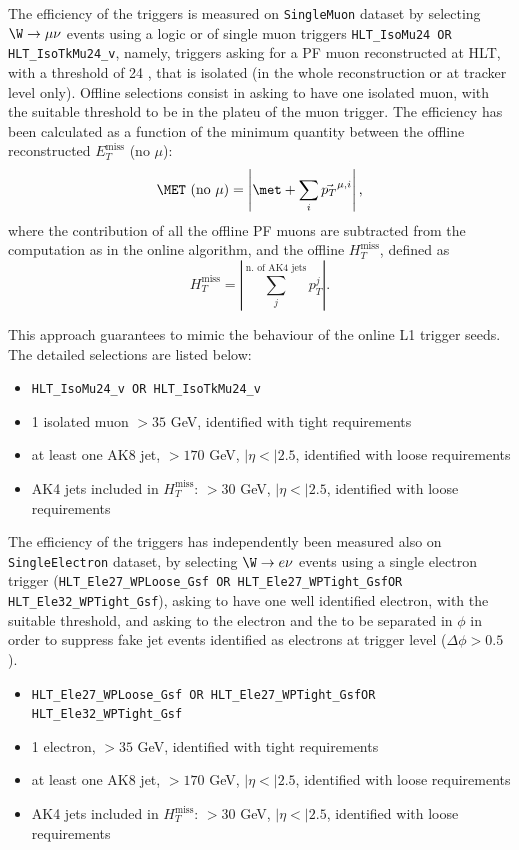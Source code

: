 \noindent The efficiency of the \met triggers is measured on {\tt SingleMuon} dataset by selecting $\W \to \mu \nu$ events using a logic or of single muon triggers {\tt HLT\_IsoMu24 OR HLT\_IsoTkMu24\_v}, namely, triggers asking for a PF muon reconstructed at HLT, with a \pt threshold of 24 \GeV, that is isolated (in the whole reconstruction or at tracker level only). Offline selections consist in asking to have one isolated muon, with the suitable \pt threshold to be in the plateu of the muon trigger. The efficiency has been calculated as a function of the minimum quantity between the offline reconstructed $E_T^{\text{miss}}$ (no $\mu$):
\begin{equation}
\MET \text{ (no } \mu \text{)} = \left| \met + \sum_i \vec{p_T}^{\mu,i} \right|,
\end{equation}
where the contribution of all the offline PF muons are subtracted from the \met computation as in the online algorithm, and the offline ${H}_T^{\text{miss}}$, defined as
\begin{equation}
{H}_T^{\text{miss}} = \left| \sum_{j}^{\text{n. of AK4 jets}} p_T^{j} \right|.
\end{equation}

\noindent This approach guarantees to mimic the behaviour of the online L1 trigger seeds. The detailed selections are listed below:
\begin{itemize}
\item {\tt HLT\_IsoMu24\_v OR HLT\_IsoTkMu24\_v}
\item 1 isolated muon \pt$>35$ GeV, identified with tight requirements
\item at least one AK8 jet, \pt$>170$ GeV, $|\eta<|2.5$, identified with loose requirements
\item AK4 jets included in ${H}_T^{\text{miss}}$: \pt$>30$ GeV, $|\eta<|2.5$, identified with loose requirements
\end{itemize}

\vspace*{1\baselineskip}

\noindent The efficiency of the \met triggers has independently been measured also on {\tt SingleElectron} dataset, by selecting $\W \rightarrow e \nu$ events using a single electron trigger ({\tt HLT\_Ele27\_WPLoose\_Gsf OR HLT\_Ele27\_WPTight\_GsfOR HLT\_Ele32\_WPTight\_Gsf}), asking to have one well identified electron, with the suitable \pt threshold, and asking to the electron and the \met to be separated in $\phi$ in order to suppress fake jet events identified as electrons at trigger level ($\Delta \phi > 0.5$).
\begin{itemize}
\item {\tt HLT\_Ele27\_WPLoose\_Gsf OR HLT\_Ele27\_WPTight\_GsfOR HLT\_Ele32\_WPTight\_Gsf}
\item 1 electron, \pt$>35$ GeV, identified with tight requirements
\item at least one AK8 jet, \pt$>170$ GeV, $|\eta<|2.5$, identified with loose requirements
\item AK4 jets included in ${H}_T^{\text{miss}}$: \pt$>30$ GeV, $|\eta<|2.5$, identified with loose requirements
\end{itemize}

